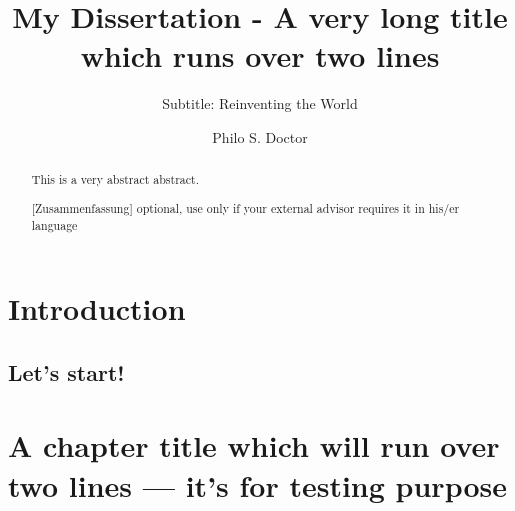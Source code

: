 \documentclass[]{usiinfthesis}
\title{My Dissertation - A very long title\\ which runs over two lines} %
\subtitle{Subtitle: Reinventing the World} %
\author{Philo S. Doctor} %
\begin{document}
\maketitle %

\frontmatter %

\begin{abstract}
This is a very abstract abstract. 

\lipsum
\end{abstract}

\begin{abstract}[Zusammenfassung]
optional, use only if your external advisor requires it in his/er
language 
\\

\lipsum
\end{abstract}

\begin{acknowledgements}
\lipsum 
\end{acknowledgements}

\tableofcontents 
\listoffigures %
\listoftables %

\mainmatter

\chapter{Introduction}
\lipsum[1-4]
\section{Let's start!}

\lipsum



\chapter[Short title]{A chapter title which will run over two lines --- it's for
  testing purpose}

\lipsum[1-2]
\end{document}
